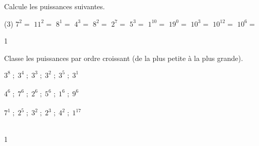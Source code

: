\documentclass[a4paper,11pt]{report}
\begin{document}
\begin{exop}{
Calcule les puissances suivantes. 
\begin{tasks}(3)
\task $7^2=$ 
\task $11^2=$
\task $8^1=$
\task $4^3=$
\task $8^2=$
\task $2^7=$
\task $5^3=$
\task $1^{10}=$
\task $19^0=$
\task $10^3=$
\task $10^{12}=$
\task $10^6=$ 
\end{tasks}
}{1}
\end{exop}

\begin{exop}{
Classe les puissances par ordre croissant (de la plus petite à la plus grande).
\begin{tasks}
\task $3^8\;;\;3^4\;;\;3^3\;;\;3^2\;;\;3^5\;;\;3^1$ \\ \\
\makebox[6.2in]{\dotfill}
\task $4^6\;;\;7^6\;;\;2^6\;;\;5^6\;;\;1^6\;;\;9^6$ \\ \\
\makebox[6.2in]{\dotfill}
\task $7^1\;;\;2^5\;;\;3^2\;;\;2^3\;;\;4^2\;;\;1^{17}$ \\ \\
\makebox[6.2in]{\dotfill}

\end{tasks}}{1}
\end{exop}





\end{document}
